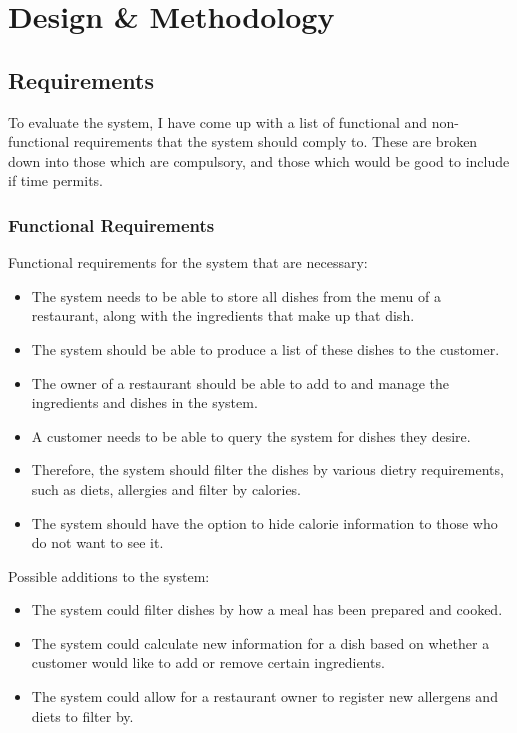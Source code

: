 \chapter{Design \& Methodology}

\section{Requirements}
\label{section:SystemRequirements}

To evaluate the system, I have come up with a list of functional and non-functional requirements that the system should comply to. These are broken down into those which are compulsory, and those which would be good to include if time permits.

\subsection{Functional Requirements}

Functional requirements for the system that are necessary:

\begin{itemize}
\item The system needs to be able to store all dishes from the menu of a restaurant, along with the ingredients that make up that dish.
\item The system should be able to produce a list of these dishes to the customer.
\item The owner of a restaurant should be able to add to and manage the ingredients and dishes in the system.
\item A customer needs to be able to query the system for dishes they desire.
\item Therefore, the system should filter the dishes by various dietry requirements, such as diets, allergies and filter by calories.
\item The system should have the option to hide calorie information to those who do not want to see it.
\end{itemize}

Possible additions to the system:

\begin{itemize}
\item The system could filter dishes by how a meal has been prepared and cooked.
\item The system could calculate new information for a dish based on whether a customer would like to add or remove certain ingredients.
\item The system could allow for a restaurant owner to register new allergens and diets to filter by.
\end{itemize}

